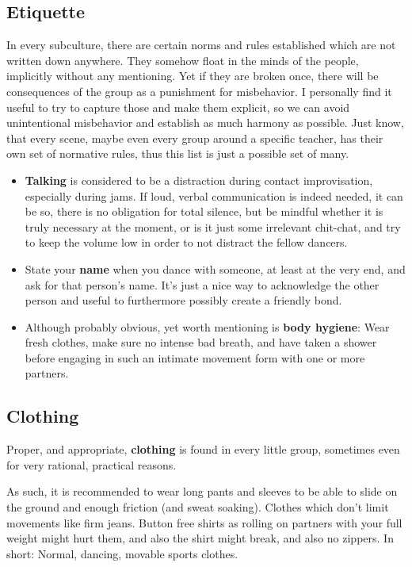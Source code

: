 \subsection{Etiquette}\label{subsec:etiquette}

In every subculture, there are certain norms and rules established which are not written down anywhere.
They somehow float in the minds of the people, implicitly without any mentioning.
Yet if they are broken once, there will be consequences of the group as a punishment for misbehavior.
I personally find it useful to try to capture those and make them explicit, so we can avoid unintentional misbehavior and establish as much harmony as possible.
Just know, that every scene, maybe even every group around a specific teacher, has their own set of normative rules, thus this list is just a possible set of many.

\begin{itemize}
    \item \textbf{Talking} is considered to be a distraction during contact improvisation, especially during jams.
    If loud, verbal communication is indeed needed, it can be so, there is no obligation for total silence, but be mindful whether it is truly necessary at the moment, or is it just some irrelevant chit-chat, and try to keep the volume low in order to not distract the fellow dancers.
    \item State your \textbf{name} when you dance with someone, at least at the very end, and ask for that person's name.
    It's just a nice way to acknowledge the other person and useful to furthermore possibly create a friendly bond.
    \item Although probably obvious, yet worth mentioning is \textbf{body hygiene}: Wear fresh clothes, make sure no intense bad breath, and have taken a shower before engaging in such an intimate movement form with one or more partners.
\end{itemize}

\subsection{Clothing}\label{subsec:clothing}

Proper, and appropriate, \textbf{clothing} is found in every little group, sometimes even for very rational, practical reasons.

As such, it is recommended to wear long pants and sleeves to be able to slide on the ground and enough friction (and sweat soaking).
Clothes which don't limit movements like firm jeans.
Button free shirts as rolling on partners with your full weight might hurt them, and also the shirt might break, and also no zippers.
In short: Normal, dancing, movable sports clothes.

